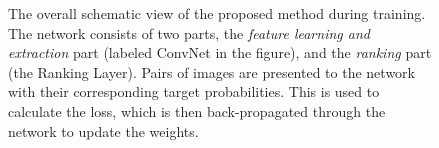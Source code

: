 \begin{figure}
{}
\caption{The overall schematic view of the proposed method during training. The network consists of two parts, the \textit{feature learning and extraction} part (labeled ConvNet in the figure), and the \textit{ranking} part (the Ranking Layer). Pairs of images are presented to the network with their corresponding target probabilities. This is used to calculate the loss, which is then back-propagated through the network to update the weights.}
\label{fig.3}
\end{figure}

